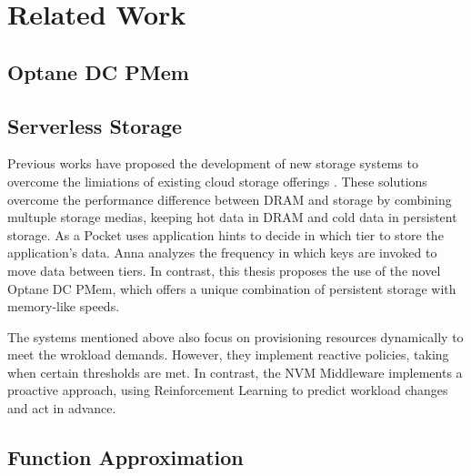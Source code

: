 \chapter[Related Work]{Related Work}

\section*{Optane DC PMem}

\section*{Serverless Storage}

Previous works have proposed the development of new storage systems to overcome the limiations of existing cloud storage offerings \cite{klimovic2018pocket,wu2019autoscaling,10.14778/3587136.3587139}. These solutions overcome the performance difference between DRAM and storage by combining multuple storage medias, keeping hot data in DRAM and cold data in persistent storage. As a Pocket \cite{klimovic2018pocket} uses application hints to decide in which tier to store the application's data. Anna \cite{} analyzes the frequency in which keys are invoked to move data between tiers. In contrast, this thesis proposes the use of the novel Optane DC PMem, which offers a unique combination of persistent storage with memory-like speeds. 

The systems mentioned above also focus on provisioning resources dynamically to meet the wrokload demands. However, they implement reactive policies, taking when certain thresholds are met. In contrast, the NVM Middleware implements a proactive approach, using Reinforcement Learning to predict workload changes and act in advance. 

\section*{Function Approximation}
